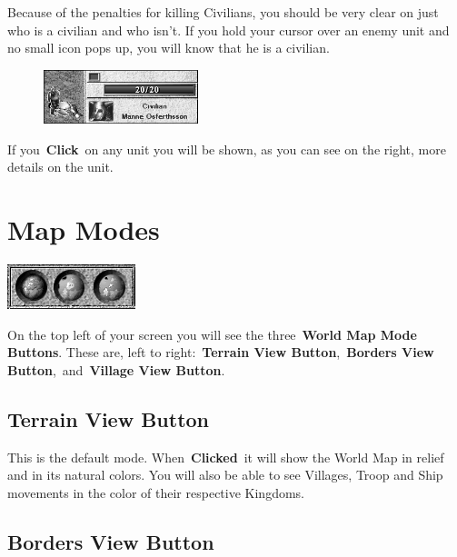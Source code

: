 Because of the penalties for killing Civilians, you should be very clear on just who is a civilian and who isn’t. If you hold your cursor over an enemy unit and no small icon pops up, you will know that he is a civilian.

\begin{figure}
\vspace{-20pt}
	\begin{center}
		\includegraphics[width=0.4\textwidth]{Ipeasant2}
\end{center}
\vspace{-20pt}
\end{figure}

If you \textbf{Click} on any unit you will be shown, as you can see on the right, more details on the unit.

\clearpage

\section{Map Modes}

\begin{center}
	\includegraphics[width=0.4\linewidth]{Imapmode}
\end{center}

On the top left of your screen you will see the three \textbf{World Map Mode Buttons}. These are, left to right: \textbf{Terrain View Button}, \textbf{Borders View Button}, and \textbf{Village View Button}.

\subsection{Terrain View Button}

This is the default mode. When \textbf{Clicked} it will show the World Map in relief and in its natural colors. You will also be able to see Villages, Troop and Ship movements in the color of their respective Kingdoms.

\subsection{Borders View Button}

